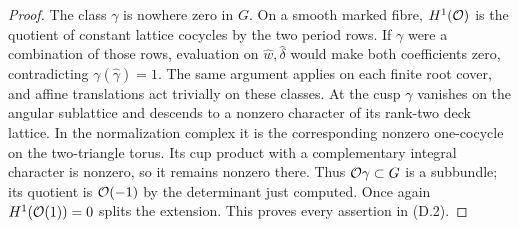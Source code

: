\begin{proof}
The class $\gamma$ is nowhere zero in $G$. On a smooth marked fibre,
$H^1(\mathcal O)$ is the quotient of constant lattice cocycles by the two
period rows. If $\gamma$ were a combination of those rows, evaluation
on $\widehat w,\widehat\delta$ would make both coefficients zero,
contradicting $\gamma(\widehat\gamma)=1$. The same argument applies
on each finite root cover, and affine translations act trivially on
these classes. At the cusp $\gamma$ vanishes on the angular sublattice
and descends to a nonzero character of its rank-two deck lattice.
In the normalization complex it is the corresponding nonzero
one-cocycle on the two-triangle torus. Its cup product with a complementary
integral character is nonzero, so it remains nonzero there. Thus
$\mathcal O\gamma\subset G$ is a subbundle; its quotient is $\mathcal O(-1)$ by
the determinant just computed. Once again $H^1(\mathcal O(1))=0$ splits the
extension. This proves every assertion in (D.2).
\end{proof}

